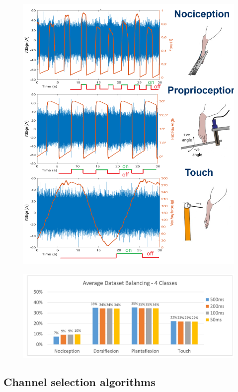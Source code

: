 \documentclass{Configuration_Files/PoliMi3i_thesis}
\begin{document}
\begin{figure}[H]
	\includegraphics[scale=0.4]{acquiredStimuli.png}
	\centering
	\end{figure}


\begin{figure}[H]
	\includegraphics[scale=0.4]{balanceClass.png}
	\centering
	\end{figure}
	

\subsection{Channel selection algorithms}
\end{document}
